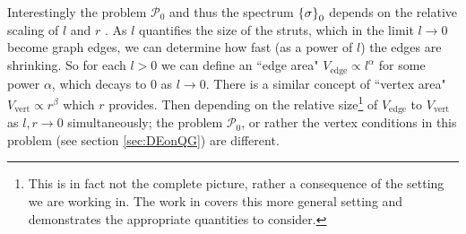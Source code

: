 Interestingly the problem $\mathcal{P}_0$ and thus the spectrum $\left\{ \sigma \right\}_0$ depends on the relative scaling of $l$ and $r$ \cite{exner2005convergence}.
As $l$ quantifies the size of the struts, which in the limit $l\rightarrow0$ become graph edges, we can determine how fast (as a power of $l$) the edges are shrinking.
So for each $l>0$ we can define an ``edge area" $V_{\mathrm{edge}} \propto l^{\alpha}$ for some power $\alpha$, which decays to 0 as $l\rightarrow0$.
There is a similar concept of ``vertex area" $V_{\mathrm{vert}} \propto r^{\beta}$ which $r$ provides.
Then depending on the relative size\footnote{This is in fact not the complete picture, rather a consequence of the setting we are working in. The work in \cite{exner2013general} covers this more general setting and demonstrates the appropriate quantities to consider.} of $V_{\mathrm{edge}}$ to $V_{\mathrm{vert}}$ as $l,r\rightarrow0$ simultaneously; the problem $\mathcal{P}_0$, or rather the vertex conditions in this problem (see section \ref{sec:DEonQG}) are different.
